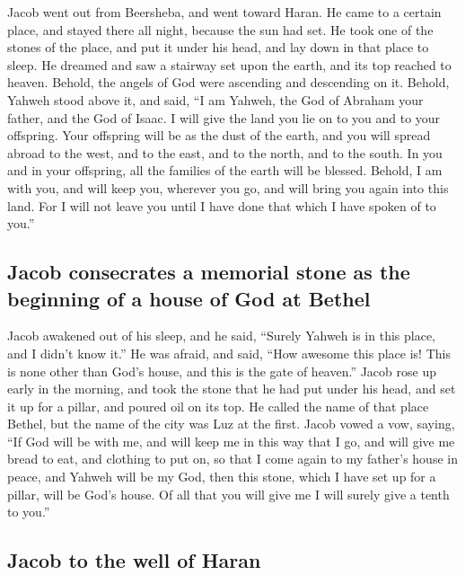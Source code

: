  Jacob went out from Beersheba, and went toward Haran.
 He came to a certain place, and stayed there all night,
because the sun had set. He took one of the stones of the place, and put
it under his head, and lay down in that place to sleep. 
He dreamed and saw a stairway set upon the earth, and its top reached to
heaven. Behold, the angels of God were ascending and descending on it.
 Behold, Yahweh stood above it, and said, ``I am Yahweh,
the God of Abraham your father, and the God of Isaac. I will give the
land you lie on to you and to your offspring.  Your
offspring will be as the dust of the earth, and you will spread abroad
to the west, and to the east, and to the north, and to the south. In you
and in your offspring, all the families of the earth will be blessed.
 Behold, I am with you, and will keep you, wherever you
go, and will bring you again into this land. For I will not leave you
until I have done that which I have spoken of to you.''

\hypertarget{jacob-consecrates-a-memorial-stone-as-the-beginning-of-a-house-of-god-at-bethel}{%
\subsection{Jacob consecrates a memorial stone as the beginning of a
house of God at
Bethel}\label{jacob-consecrates-a-memorial-stone-as-the-beginning-of-a-house-of-god-at-bethel}}

 Jacob awakened out of his sleep, and he said, ``Surely
Yahweh is in this place, and I didn't know it.''  He was
afraid, and said, ``How awesome this place is! This is none other than
God's house, and this is the gate of heaven.''  Jacob
rose up early in the morning, and took the stone that he had put under
his head, and set it up for a pillar, and poured oil on its top.
 He called the name of that place Bethel, but the name of
the city was Luz at the first.  Jacob vowed a vow,
saying, ``If God will be with me, and will keep me in this way that I
go, and will give me bread to eat, and clothing to put on,
 so that I come again to my father's house in peace, and
Yahweh will be my God,  then this stone, which I have set
up for a pillar, will be God's house. Of all that you will give me I
will surely give a tenth to you.''

\hypertarget{jacob-to-the-well-of-haran}{%
\subsection{Jacob to the well of
Haran}\label{jacob-to-the-well-of-haran}}

